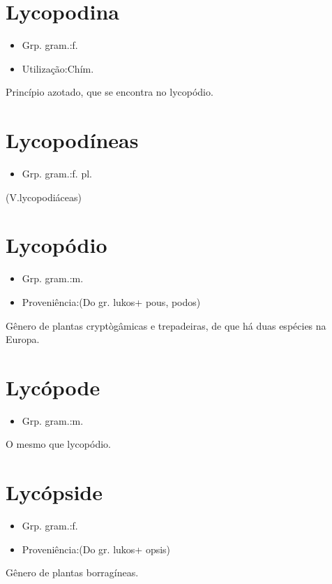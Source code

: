 \section{Lycopodina}
\begin{itemize}
\item {Grp. gram.:f.}
\end{itemize}
\begin{itemize}
\item {Utilização:Chím.}
\end{itemize}
Princípio azotado, que se encontra no lycopódio.
\section{Lycopodíneas}
\begin{itemize}
\item {Grp. gram.:f. pl.}
\end{itemize}
(V.lycopodiáceas)
\section{Lycopódio}
\begin{itemize}
\item {Grp. gram.:m.}
\end{itemize}
\begin{itemize}
\item {Proveniência:(Do gr. \textunderscore lukos\textunderscore  + \textunderscore pous\textunderscore , \textunderscore podos\textunderscore )}
\end{itemize}
Gênero de plantas cryptògâmicas e trepadeiras, de que há duas espécies na Europa.
\section{Lycópode}
\begin{itemize}
\item {Grp. gram.:m.}
\end{itemize}
O mesmo que \textunderscore lycopódio\textunderscore .
\section{Lycópside}
\begin{itemize}
\item {Grp. gram.:f.}
\end{itemize}
\begin{itemize}
\item {Proveniência:(Do gr. \textunderscore lukos\textunderscore  + \textunderscore opsis\textunderscore )}
\end{itemize}
Gênero de plantas borragíneas.
